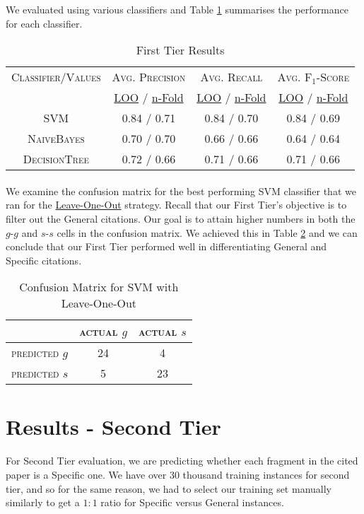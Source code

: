 We evaluated using various classifiers and Table \ref{tab:firsttieresults} summarises the performance for each classifier.

\begin{table}[h]
	\center
	\begin{tabular}{ c | c  c  c }
		\textsc{Classifier/Values} & \textsc{Avg. Precision} & \textsc{Avg. Recall} & \textsc{Avg. F$_1$-Score} \\
		& \url{LOO} / \url{n-Fold} & \url{LOO} / \url{n-Fold} & \url{LOO} / \url{n-Fold} \\
		\hline
		\textsc{SVM} 			& 0.84 / 0.71 & 0.84 / 0.70 & 0.84 / 0.69 \\
		\textsc{NaiveBayes} 	& 0.70 / 0.70 & 0.66 / 0.66 & 0.64 / 0.64 \\
		\textsc{DecisionTree}	& 0.72 / 0.66 & 0.71 / 0.66 & 0.71 / 0.66
	\end{tabular}
	\caption{First Tier Results}
	\label{tab:firsttieresults}
\end{table}

\paragraph{}
We examine the confusion matrix for the best performing SVM classifier that we ran for the \url{Leave-One-Out} strategy. Recall that our First Tier's objective is to filter out the General citations. Our goal is to attain higher numbers in both the $g$-$g$ and $s$-$s$ cells in the confusion matrix. We achieved this in Table \ref{tab:svmconfusionmatrix} and we can conclude that our First Tier performed well in differentiating General and Specific citations.

\begin{table}[h]
	\center
	\begin{tabular}{ c | c  c }
		 & \textsc{actual $g$} & \textsc{actual $s$} \\
		\hline
		\textsc{predicted $g$} 	& 24 & 4 \\
		\textsc{predicted $s$}		& 5 & 23
	\end{tabular}
	\caption{Confusion Matrix for SVM with Leave-One-Out}
	\label{tab:svmconfusionmatrix}
\end{table}

\section{Results - Second Tier}
\paragraph{}
For Second Tier evaluation, we are predicting whether each fragment in the cited paper is a Specific one. We have over 30 thousand training instances for second tier, and so for the same reason, we had to select our training set manually similarly to get a $1:1$ ratio for Specific versus General instances.

